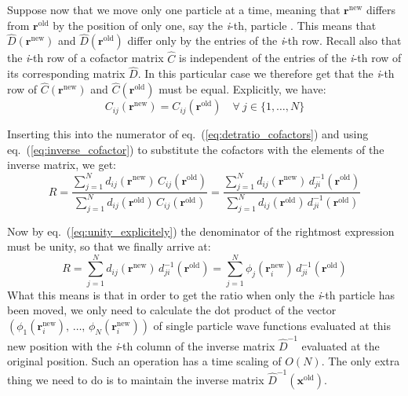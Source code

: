 \documentclass[%
oneside,                 %
final,                   %
10pt]{article}
\begin{document}
Suppose now that we move only one particle  at a time, meaning that
$\mathbf{r}^{\mathrm{new}}$ differs from $\mathbf{r}^{\mathrm{old}}$ by the
position of only one, say the \emph{i}-th, particle . This means that $\hat{D}(\mathbf{r}^{\mathrm{new}})$ and $\hat{D}(\mathbf{r}^{\mathrm{old}})$ differ
only by the entries of the \emph{i}-th row.  Recall also that the \emph{i}-th row
of a cofactor matrix $\hat{C}$ is independent of the entries of the
\emph{i}-th row of its corresponding matrix $\hat{D}$. In this particular
case we therefore get that the \emph{i}-th row of $\hat{C}(\mathbf{r}^{\mathrm{new}})$ 
and $\hat{C}(\mathbf{r}^{\mathrm{old}})$ must be
equal. Explicitly, we have:
\begin{equation}
C_{ij}(\mathbf{r}^{\mathrm{new}}) = C_{ij}(\mathbf{r}^{\mathrm{old}})\quad
\forall\ j\in\{1,\dots,N\}
\end{equation}

Inserting this into the numerator of eq.~(\ref{eq:detratio_cofactors})
and using eq.~(\ref{eq:inverse_cofactor}) to substitute the cofactors
with the elements of the inverse matrix, we get:
\begin{equation}
R =\frac{\sum_{j=1}^N d_{ij}(\mathbf{r}^{\mathrm{new}})\,
C_{ij}(\mathbf{r}^{\mathrm{old}})}
{\sum_{j=1}^N d_{ij}(\mathbf{r}^{\mathrm{old}})\,
C_{ij}(\mathbf{r}^{\mathrm{old}})} =
\frac{\sum_{j=1}^N d_{ij}(\mathbf{r}^{\mathrm{new}})\,
d_{ji}^{-1}(\mathbf{r}^{\mathrm{old}})}
{\sum_{j=1}^N d_{ij}(\mathbf{r}^{\mathrm{old}})\,
d_{ji}^{-1}(\mathbf{r}^{\mathrm{old}})}
\end{equation}

Now by eq.~(\ref{eq:unity_explicitely}) the denominator of the rightmost
expression must be unity, so that we finally arrive at:
\begin{equation}
R =
\sum_{j=1}^N d_{ij}(\mathbf{r}^{\mathrm{new}})\,
d_{ji}^{-1}(\mathbf{r}^{\mathrm{old}}) = 
\sum_{j=1}^N \phi_j(\mathbf{r}_i^{\mathrm{new}})\,
d_{ji}^{-1}(\mathbf{r}^{\mathrm{old}})
\label{eq:detratio_inverse}
\end{equation}
What this means is that in order to get the ratio when only the \emph{i}-th
particle  has been moved, we only need to calculate the dot
product of the vector $\left(\phi_1(\mathbf{r}_i^\mathrm{new}),\,\dots,\,\phi_N(\mathbf{r}_i^\mathrm{new})\right)$ of single particle  wave functions
evaluated at this new position with the \emph{i}-th column of the inverse
matrix $\hat{D}^{-1}$ evaluated at the original position. Such
an operation has a time scaling of $O(N)$. The only extra thing we
need to do is to maintain the inverse matrix $\hat{D}^{-1}(\mathbf{x}^{\mathrm{old}})$.
\end{document}
